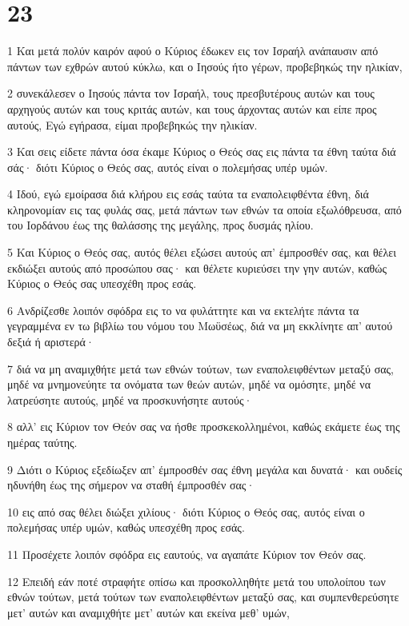 \chapter{23}

\par 1 Και μετά πολύν καιρόν αφού ο Κύριος έδωκεν εις τον Ισραήλ ανάπαυσιν από πάντων των εχθρών αυτού κύκλω, και ο Ιησούς ήτο γέρων, προβεβηκώς την ηλικίαν,
\par 2 συνεκάλεσεν ο Ιησούς πάντα τον Ισραήλ, τους πρεσβυτέρους αυτών και τους αρχηγούς αυτών και τους κριτάς αυτών, και τους άρχοντας αυτών και είπε προς αυτούς, Εγώ εγήρασα, είμαι προβεβηκώς την ηλικίαν.
\par 3 Και σεις είδετε πάντα όσα έκαμε Κύριος ο Θεός σας εις πάντα τα έθνη ταύτα διά σάς· διότι Κύριος ο Θεός σας, αυτός είναι ο πολεμήσας υπέρ υμών.
\par 4 Ιδού, εγώ εμοίρασα διά κλήρου εις εσάς ταύτα τα εναπολειφθέντα έθνη, διά κληρονομίαν εις τας φυλάς σας, μετά πάντων των εθνών τα οποία εξωλόθρευσα, από του Ιορδάνου έως της θαλάσσης της μεγάλης, προς δυσμάς ηλίου.
\par 5 Και Κύριος ο Θεός σας, αυτός θέλει εξώσει αυτούς απ' έμπροσθέν σας, και θέλει εκδιώξει αυτούς από προσώπου σας· και θέλετε κυριεύσει την γην αυτών, καθώς Κύριος ο Θεός σας υπεσχέθη προς εσάς.
\par 6 Ανδρίζεσθε λοιπόν σφόδρα εις το να φυλάττητε και να εκτελήτε πάντα τα γεγραμμένα εν τω βιβλίω του νόμου του Μωϋσέως, διά να μη εκκλίνητε απ' αυτού δεξιά ή αριστερά·
\par 7 διά να μη αναμιχθήτε μετά των εθνών τούτων, των εναπολειφθέντων μεταξύ σας, μηδέ να μνημονεύητε τα ονόματα των θεών αυτών, μηδέ να ομόσητε, μηδέ να λατρεύσητε αυτούς, μηδέ να προσκυνήσητε αυτούς·
\par 8 αλλ' εις Κύριον τον Θεόν σας να ήσθε προσκεκολλημένοι, καθώς εκάμετε έως της ημέρας ταύτης.
\par 9 Διότι ο Κύριος εξεδίωξεν απ' έμπροσθέν σας έθνη μεγάλα και δυνατά· και ουδείς ηδυνήθη έως της σήμερον να σταθή έμπροσθέν σας·
\par 10 εις από σας θέλει διώξει χιλίους· διότι Κύριος ο Θεός σας, αυτός είναι ο πολεμήσας υπέρ υμών, καθώς υπεσχέθη προς εσάς.
\par 11 Προσέχετε λοιπόν σφόδρα εις εαυτούς, να αγαπάτε Κύριον τον Θεόν σας.
\par 12 Επειδή εάν ποτέ στραφήτε οπίσω και προσκολληθήτε μετά του υπολοίπου των εθνών τούτων, μετά τούτων των εναπολειφθέντων μεταξύ σας, και συμπενθερεύσητε μετ' αυτών και αναμιχθήτε μετ' αυτών και εκείνα μεθ' υμών,
